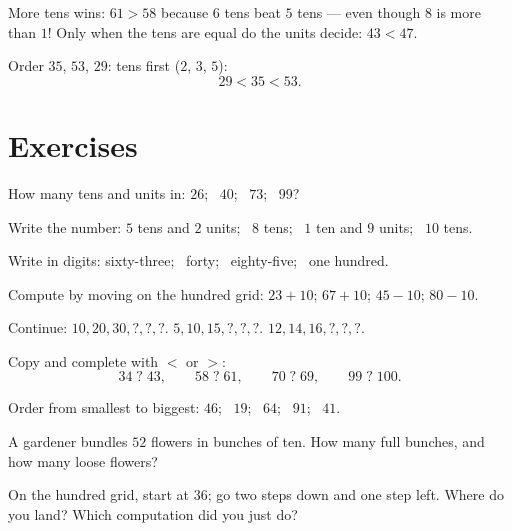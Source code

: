 \begin{method}\label{met:g1:tens:compare}
More tens wins: $61 > 58$ because $6$ tens beat $5$ tens ---
even though $8$ is more than $1$! Only when the tens are equal do
the units decide: $43 < 47$.
\end{method}

\begin{example}\label{ex:g1:tens:compare}
Order $35$, $53$, $29$: tens first ($2$, $3$, $5$):
\[
29 < 35 < 53 .
\]
\end{example}

\section{Exercises}

\begin{exercise}[$\star$]\label{exo:g1:tens:1}
How many tens and units in: $26$; \ $40$; \ $73$; \ $99$?
\end{exercise}

\begin{exercise}[$\star$]\label{exo:g1:tens:2}
Write the number: $5$ tens and $2$ units; \ $8$ tens; \ $1$ ten and
$9$ units; \ $10$ tens.
\end{exercise}

\begin{exercise}[$\star$]\label{exo:g1:tens:3}
Write in digits: sixty-three; \ forty; \ eighty-five; \ one
hundred.
\end{exercise}

\begin{exercise}[$\star$]\label{exo:g1:tens:4}
Compute by moving on the hundred grid: $23 + 10$; \quad $67 + 10$;
\quad $45 - 10$; \quad $80 - 10$.
\end{exercise}

\begin{exercise}[$\star$]\label{exo:g1:tens:5}
Continue: $10, 20, 30, ?, ?, ?$. \quad
$5, 10, 15, ?, ?, ?$. \quad $12, 14, 16, ?, ?, ?$.
\end{exercise}

\begin{exercise}[$\star$]\label{exo:g1:tens:6}
Copy and complete with $<$ or $>$:
\[
34 \;?\; 43, \qquad
58 \;?\; 61, \qquad
70 \;?\; 69, \qquad
99 \;?\; 100 .
\]
\end{exercise}

\begin{exercise}[$\star$]\label{exo:g1:tens:7}
Order from smallest to biggest: $46$; \ $19$; \ $64$; \ $91$; \
$41$.
\end{exercise}

\begin{exercise}[$\star$]\label{exo:g1:tens:8}
A gardener bundles $52$ flowers in bunches of ten. How many full
bunches, and how many loose flowers?
\end{exercise}

\begin{exercise}[$\star\star$]\label{exo:g1:tens:9}
On the hundred grid, start at $36$; go two steps down and one step
left. Where do you land? Which computation did you just do?
\end{exercise}
